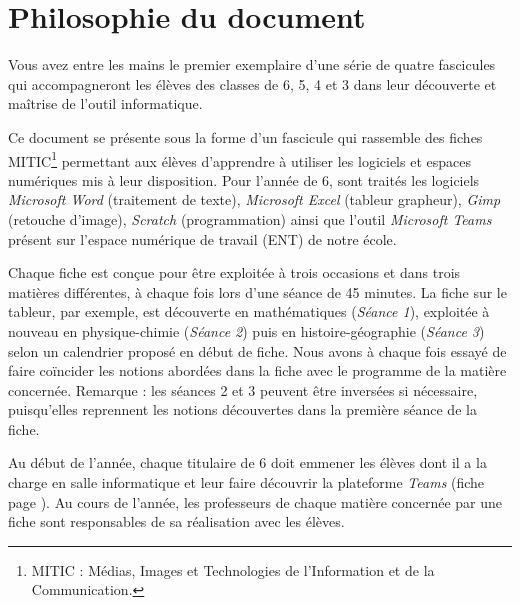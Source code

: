 \chapter*{Philosophie du document}



Vous avez entre les mains le premier exemplaire d'une série de quatre fascicules qui accompagneront les élèves des classes de 6, 5, 4 et 3 dans leur découverte et maîtrise de l'outil informatique.

\vspace{18pt}

Ce document se présente sous la forme d'un fascicule qui rassemble des fiches MITIC\footnote{MITIC : Médias, Images et Technologies de l'Information et de la Communication.} permettant aux élèves d'apprendre à utiliser les logiciels et espaces numériques mis à leur disposition. Pour l'année de 6, sont traités les logiciels \emph{Microsoft Word} (traitement de texte), \emph{Microsoft Excel} (tableur grapheur), \emph{Gimp} (retouche d'image), \emph{Scratch} (programmation) ainsi que l'outil \emph{Microsoft Teams} présent sur l'espace numérique de travail (ENT) de notre école. %

\vspace{18pt}


Chaque fiche est conçue pour être exploitée à trois occasions et dans trois matières différentes, à chaque fois lors d'une séance de 45 minutes. La fiche sur le tableur, par exemple, est découverte en mathématiques (\emph{Séance 1}), exploitée à nouveau en physique-chimie (\emph{Séance 2}) puis en histoire-géographie (\emph{Séance 3}) selon un calendrier proposé en début de fiche. Nous avons à chaque fois essayé de faire coïncider les notions abordées dans la fiche avec le programme de la matière concernée. Remarque : les séances 2 et 3 peuvent être inversées si nécessaire, puisqu'elles reprennent les notions découvertes dans la première séance de la fiche.

\vspace{18pt}

Au début de l'année, chaque titulaire de 6 doit emmener les élèves dont il a la charge en salle informatique et leur faire découvrir la plateforme \emph{Teams} (fiche page \pageref{teams1}). Au cours de l'année, les professeurs de chaque matière concernée par une fiche sont responsables de sa réalisation avec les élèves.

